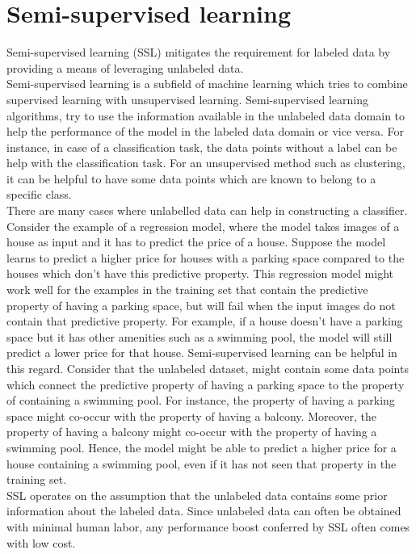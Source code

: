 \section{Semi-supervised learning}
Semi-supervised learning (SSL)\cite{van2020} mitigates the requirement for labeled data by providing a means of leveraging unlabeled data. \\ Semi-supervised learning is a subfield of machine learning which tries to combine supervised learning with unsupervised learning. Semi-supervised learning algorithms, try to use the information available in the unlabeled data domain to help the performance of the model in the labeled data domain or vice versa. For instance, in case of a classification task, the data points without a label can be help with the classification task. For an unsupervised method such as clustering, it can be helpful to have some data points which are known to belong to a specific class. \\
There are many cases where unlabelled data can help in constructing a classifier. Consider the example of a regression model, where the model takes images of a house as input and it has to predict the price of a house. Suppose the model learns to predict a higher price for houses with a parking space compared to the houses which don't have this predictive property. This regression model might work well for the examples in the training set that contain the predictive property of having a parking space, but will fail when the input images do not contain that predictive property. For example, if a house doesn't have a parking space but it has other amenities such as a swimming pool, the model will still predict a lower price for that house. Semi-supervised learning can be helpful in this regard. Consider that the unlabeled dataset, might contain some data points which connect the predictive property of having a parking space to the property of containing a swimming pool. For instance, the property of having a parking space might co-occur with the property of having a balcony. Moreover, the property of having a balcony might co-occur with the property of having a swimming pool. Hence, the model might be able to predict a higher price for a house containing a swimming pool, even if it has not seen that property in the training set.\\
SSL operates on the assumption that the unlabeled data contains some prior information about the labeled data. Since unlabeled data can often be obtained with minimal human labor, any performance boost conferred by SSL often comes with low cost. \\

